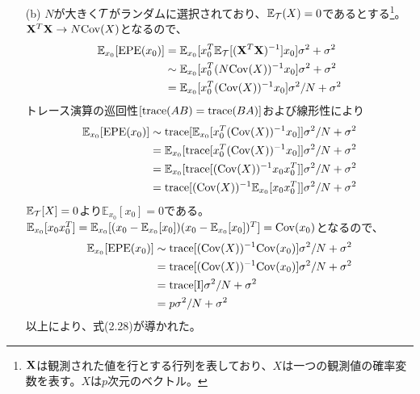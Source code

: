 \documentclass{jsarticle}
\begin{document}
\begin{enumerate}
\item[(b)]
$N$が大きく${\cal T}$がランダムに選択されており、$\mathbb{E}_{\cal T}(X)=0$であるとする\footnote{${\bf X}$は観測された値を行とする行列を表しており、$X$は一つの観測値の確率変数を表す。$X$は$p$次元のベクトル。}。${\bf X}^T{\bf X}\to N{\rm Cov}(X)$となるので、
\begin{align*}
\mathbb{E}_{x_0}[{\rm EPE}(x_0)]&=\mathbb{E}_{x_0}[x_0^T \mathbb{E}_{\cal T}[({\bf X}^T{\bf X})^{-1}]x_0]\sigma^2+\sigma^2\\
&\sim\mathbb{E}_{x_0}[x_0^T (N{\rm Cov}(X))^{-1}x_0]\sigma^2+\sigma^2\\
&=\mathbb{E}_{x_0}[x_0^T ({\rm Cov}(X))^{-1}x_0]\sigma^2/N+\sigma^2
\end{align*}
トレース演算の巡回性$[{\rm trace}(AB)={\rm trace}(BA)]$および線形性により
\begin{align*}
\mathbb{E}_{x_0}[{\rm EPE}(x_0)]&\sim{\rm trace}[\mathbb{E}_{x_0}[x_0^T ({\rm Cov}(X))^{-1}x_0]]\sigma^2/N+\sigma^2\\
&=\mathbb{E}_{x_0}[{\rm trace}[x_0^T ({\rm Cov}(X))^{-1}x_0]]\sigma^2/N+\sigma^2\\
&=\mathbb{E}_{x_0}[{\rm trace}[ ({\rm Cov}(X))^{-1}x_0x_0^T]]\sigma^2/N+\sigma^2\\
&={\rm trace}[ ({\rm Cov}(X))^{-1}\mathbb{E}_{x_0}[x_0x_0^T]]\sigma^2/N+\sigma^2
\end{align*}
$\mathbb{E}_{\cal T}[X]=0$より$\mathbb{E}_{x_0}[x_0]=0$である。$\mathbb{E}_{x_0}[x_0x_0^T]=\mathbb{E}_{x_0}[(x_0-\mathbb{E}_{x_0}[x_0])(x_0-\mathbb{E}_{x_0}[x_0])^T]={\rm Cov}(x_0)$となるので、
\begin{align*}
\mathbb{E}_{x_0}[{\rm EPE}(x_0)]&\sim{\rm trace}[ ({\rm Cov}(X))^{-1}{\rm Cov}(x_0)]\sigma^2/N+\sigma^2\\
&={\rm trace}[ ({\rm Cov}(X))^{-1}{\rm Cov}(x_0)]\sigma^2/N+\sigma^2\\
&={\rm trace}[{\rm I}]\sigma^2/N+\sigma^2\\
&=p\sigma^2/N+\sigma^2
\end{align*}
以上により、式(2.28)が導かれた。
\end{enumerate}
\end{document}
